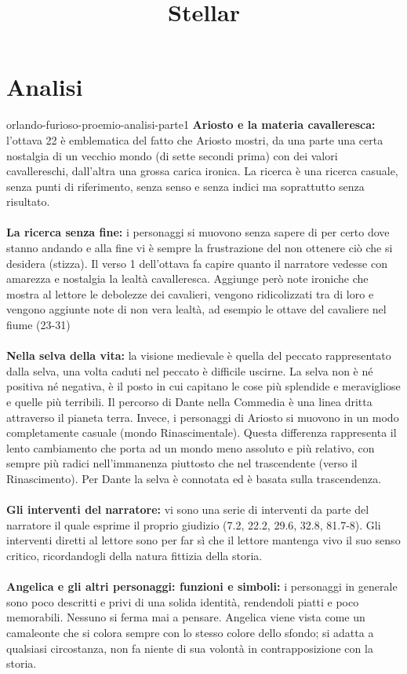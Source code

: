 \documentclass[preview]{standalone}
\begin{document}
\title{Stellar}
\genpage

\section{Analisi}

\begin{snippet}{orlando-furioso-proemio-analisi-parte1}
    \textbf{Ariosto e la materia cavalleresca:} l'ottava 22 è emblematica del fatto che Ariosto mostri, da una parte una
    certa nostalgia di un vecchio mondo (di sette secondi prima) con dei valori cavallereschi,
    dall'altra una grossa carica ironica.
    La ricerca è una ricerca casuale, senza punti di riferimento, senza senso e senza indici
    ma soprattutto senza risultato.
    \\\\
    \textbf{La ricerca senza fine:} i personaggi si muovono senza sapere di per certo dove stanno andando
    e alla fine vi è sempre la frustrazione del non ottenere ciò che si desidera (stizza).
    Il verso 1 dell'ottava  fa capire quanto il narratore
    vedesse con amarezza e nostalgia la lealtà cavalleresca.
    Aggiunge però note ironiche che mostra al lettore le debolezze dei cavalieri, vengono
    ridicolizzati tra di loro e vengono aggiunte note di non vera lealtà, ad esempio le ottave del
    cavaliere nel fiume (23-31)
    \\\\
    \textbf{Nella selva della vita:} la visione medievale è quella del peccato rappresentato dalla selva, una volta caduti
    nel peccato è difficile uscirne. La selva non è né positiva né negativa, è il posto
    in cui capitano le cose più splendide e meravigliose e quelle più terribili.
    Il percorso di Dante nella Commedia è una linea dritta attraverso il pianeta terra.
    Invece, i personaggi di Ariosto si muovono in un modo completamente casuale (mondo Rinascimentale).
    Questa differenza rappresenta il lento cambiamento che porta ad un mondo meno assoluto e più relativo,
    con sempre più radici nell'immanenza piuttosto che nel trascendente (verso il Rinascimento).
    Per Dante la selva è connotata ed è basata sulla trascendenza.
    \\\\
    \textbf{Gli interventi del narratore:} vi sono una serie di interventi da parte del narratore il quale
    esprime il proprio giudizio (7.2, 22.2, 29.6, 32.8, 81.7-8).
    Gli interventi diretti al lettore sono per far sì che il lettore mantenga vivo il suo senso critico, ricordandogli
    della natura fittizia della storia.
    \\\\
    \textbf{Angelica e gli altri personaggi: funzioni e simboli:}
    i personaggi in generale sono poco descritti e privi di una solida identità, rendendoli piatti e
    poco memorabili. Nessuno si ferma mai a pensare.
    Angelica viene vista come un camaleonte che si colora sempre con lo stesso colore dello
    sfondo; si adatta a qualsiasi circostanza, non fa niente di sua volontà in contrapposizione con
    la storia.
\end{snippet}
\end{document}
